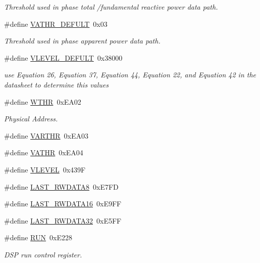 \begin{DoxyCompactItemize}
\begin{DoxyCompactList}\small\item\em Threshold used in phase total /fundamental reactive power data path. \end{DoxyCompactList}\item 
\#define \hyperlink{a00036_a3ca4a19859a50d3b85939e9b0c145637}{V\-A\-T\-H\-R\-\_\-\-D\-E\-F\-U\-L\-T}~0x03
\begin{DoxyCompactList}\small\item\em Threshold used in phase apparent power data path. \end{DoxyCompactList}\item 
\#define \hyperlink{a00036_a489507ec5a9fe148bbc1b61afc07f27a}{V\-L\-E\-V\-E\-L\-\_\-\-D\-E\-F\-U\-L\-T}~0x38000
\begin{DoxyCompactList}\small\item\em use Equation 26, Equation 37, Equation 44, Equation 22, and Equation 42 in the datasheet to determine this values \end{DoxyCompactList}\item 
\#define \hyperlink{a00036_a60f6494fba59e1f242240d12202f4746}{W\-T\-H\-R}~0x\-E\-A02
\begin{DoxyCompactList}\small\item\em Physical Address. \end{DoxyCompactList}\item 
\#define \hyperlink{a00036_a37f9d81c6baec7ee49887b6f19ac1996}{V\-A\-R\-T\-H\-R}~0x\-E\-A03
\item 
\#define \hyperlink{a00036_af97b8b6a3a2c63818edbc7f6cdceae23}{V\-A\-T\-H\-R}~0x\-E\-A04
\item 
\#define \hyperlink{a00036_a601225f0680bfe13cf5fc0c2c52f37c5}{V\-L\-E\-V\-E\-L}~0x439\-F
\item 
\#define \hyperlink{a00036_ac23cb2354e07d7403fca849805a8e278}{L\-A\-S\-T\-\_\-\-R\-W\-D\-A\-T\-A8}~0x\-E7\-F\-D
\item 
\#define \hyperlink{a00036_afcefca411effe86930341732382fb5e5}{L\-A\-S\-T\-\_\-\-R\-W\-D\-A\-T\-A16}~0x\-E9\-F\-F
\item 
\#define \hyperlink{a00036_a0d09934e23666ce21357121f281f2f2a}{L\-A\-S\-T\-\_\-\-R\-W\-D\-A\-T\-A32}~0x\-E5\-F\-F
\item 
\#define \hyperlink{a00036_a35f69a612b07bbf1de53bbbd8d877c09}{R\-U\-N}~0x\-E228
\begin{DoxyCompactList}\small\item\em D\-S\-P run control register. \end{DoxyCompactList}\item 

\end{DoxyCompactItemize}
